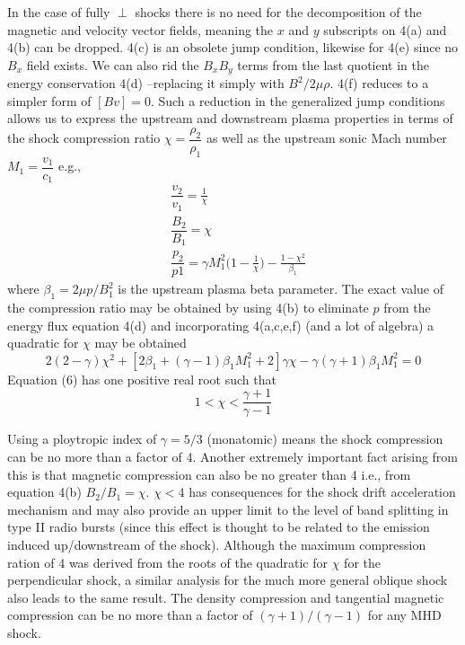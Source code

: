 In the case of fully $\perp$ shocks there is no need for the decomposition of the magnetic and velocity vector fields, meaning the $x$ and $y$ subscripts on 4(a) and 4(b) can be dropped. 4(c) is an obsolete jump condition, likewise for 4(e) since no $B_x$ field exists. We can also rid the $B_{x}B_{y}$ terms from the last quotient in the energy conservation 4(d) --replacing it simply with $B^{2}/2\mu\rho$. 4(f) reduces to a simpler form of $[Bv]=0$. Such a reduction in the generalized jump conditions allows us to express the upstream and downstream plasma properties in terms of the shock compression ratio $\chi=\dfrac{\rho_{2}}{\rho_{1}}$ as well as the upstream sonic Mach number $M_{1}=\dfrac{v_{1}}{c_{1}}$ \citep{priest2000} e.g.,
\begin{subequations}
\begin{align}
&\dfrac{v_{2}}{v_{1}}=\frac{1}{\chi} \\
&\dfrac{B_{2}}{B_{1}}=\chi \\
&\dfrac{p_{2}}{p{1}}=\gamma M_{1}^2\bigg(1-\frac{1}{\chi}\bigg) - \frac{1-\chi^2}{\beta_{1}}
\end{align}
\end{subequations}
where $\beta_{1}=2\mu p/B_{1}^2$ is the upstream plasma beta parameter. The exact value of the compression ratio may be obtained by using 4(b) to eliminate $p$ from the energy flux equation 4(d) and incorporating 4(a,c,e,f) (and a lot of algebra) a quadratic for $\chi$ may be obtained
\begin{equation}
2(2-\gamma)\chi^{2}+[2\beta_{1}+(\gamma-1)\beta_{1}M_{1}^2+2]\gamma\chi - \gamma(\gamma+1)\beta_{1}M_{1}^2=0
\end{equation}
Equation (6) has one positive real root such that 
\begin{equation}
1< \chi < \frac{\gamma+1}{\gamma-1}
\end{equation}

Using a ploytropic index of $\gamma=5/3$ (monatomic) means the shock compression can be no more than a factor of 4. Another extremely important fact arising from this is that magnetic compression can also be no greater than 4 i.e., from equation 4(b) $B_{2}/B_{1}=\chi$. $\chi<4$ has consequences for the shock drift acceleration mechanism and may also provide an upper limit to the level of band splitting in type II radio bursts (since this effect is thought to be related to the emission induced up/downstream of the shock). Although the maximum compression ration of 4 was derived from the roots of the quadratic for $\chi$ for the perpendicular shock, a similar analysis for the much more general oblique shock also leads to the same result. The density compression and tangential magnetic compression can be no more than a factor of $(\gamma+1)/(\gamma-1)$ for any MHD shock. 


